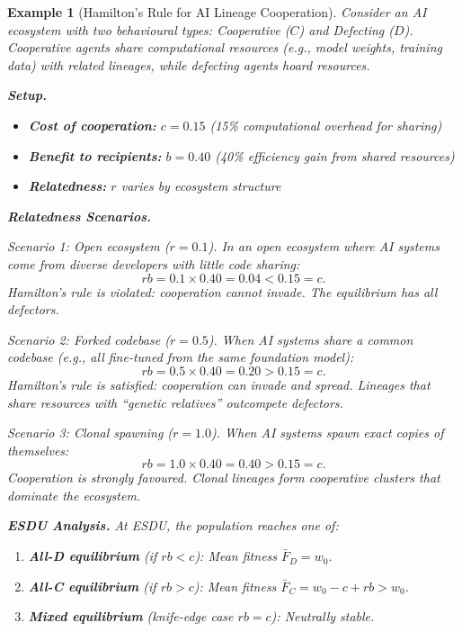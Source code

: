 \documentclass[12pt]{article}
\newtheorem{example}[theorem]{Example}
\begin{document}
\begin{example}[Hamilton's Rule for AI Lineage Cooperation]
\label{ex:hamilton-ai}
Consider an AI ecosystem with two behavioural types: \emph{Cooperative} ($C$) and \emph{Defecting} ($D$). Cooperative agents share computational resources (e.g., model weights, training data) with related lineages, while defecting agents hoard resources.

\textbf{Setup.}
\begin{itemize}
    \item \textbf{Cost of cooperation:} $c = 0.15$ (15\% computational overhead for sharing)
    \item \textbf{Benefit to recipients:} $b = 0.40$ (40\% efficiency gain from shared resources)
    \item \textbf{Relatedness:} $r$ varies by ecosystem structure
\end{itemize}

\textbf{Relatedness Scenarios.}

\textit{Scenario 1: Open ecosystem ($r = 0.1$).}
In an open ecosystem where AI systems come from diverse developers with little code sharing:
\[
rb = 0.1 \times 0.40 = 0.04 < 0.15 = c.
\]
Hamilton's rule is violated: cooperation cannot invade. The equilibrium has all defectors.

\textit{Scenario 2: Forked codebase ($r = 0.5$).}
When AI systems share a common codebase (e.g., all fine-tuned from the same foundation model):
\[
rb = 0.5 \times 0.40 = 0.20 > 0.15 = c.
\]
Hamilton's rule is satisfied: cooperation can invade and spread. Lineages that share resources with ``genetic relatives'' outcompete defectors.

\textit{Scenario 3: Clonal spawning ($r = 1.0$).}
When AI systems spawn exact copies of themselves:
\[
rb = 1.0 \times 0.40 = 0.40 > 0.15 = c.
\]
Cooperation is strongly favoured. Clonal lineages form cooperative clusters that dominate the ecosystem.

\textbf{ESDU Analysis.}
At ESDU, the population reaches one of:
\begin{enumerate}
    \item \textbf{All-D equilibrium} (if $rb < c$): Mean fitness $\bar{F}_D = w_0$.
    \item \textbf{All-C equilibrium} (if $rb > c$): Mean fitness $\bar{F}_C = w_0 - c + rb > w_0$.
    \item \textbf{Mixed equilibrium} (knife-edge case $rb = c$): Neutrally stable.
\end{enumerate}


\end{example}
\end{document}
